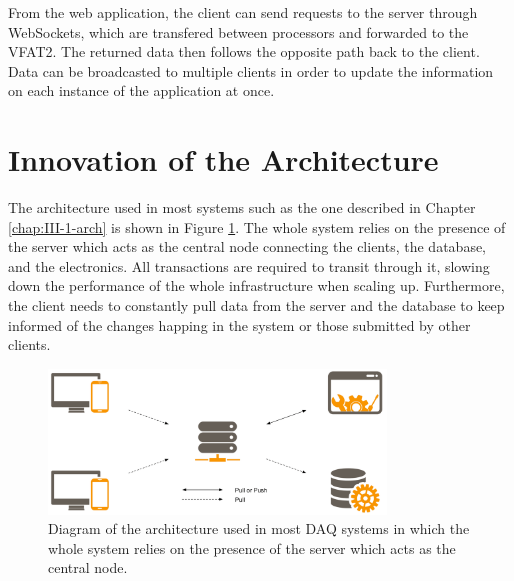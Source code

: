       From the web application, the client can send requests to the server through WebSockets, which are transfered between processors and forwarded to the VFAT2. The returned data then follows the opposite path back to the client. Data can be broadcasted to multiple clients in order to update the information on each instance of the application at once.

  \section{Innovation of the Architecture}

    The architecture used in most systems such as the one described in Chapter \ref{chap:III-1-arch} is shown in Figure \ref{fig:III-2-system-old}. The whole system relies on the presence of the server which acts as the central node connecting the clients, the database, and the electronics. All transactions are required to transit through it, slowing down the performance of the whole infrastructure when scaling up. Furthermore, the client needs to constantly pull data from the server and the database to keep informed of the changes happing in the system or those submitted by other clients. \\

    \begin{figure}[h!]
      \centering
      \includegraphics[width=0.8\textwidth]{img/III-2-web-daq/old-sys.png}
      \caption{Diagram of the architecture used in most DAQ systems in which the whole system relies on the presence of the server which acts as the central node.}
      \label{fig:III-2-system-old}
    \end{figure}

